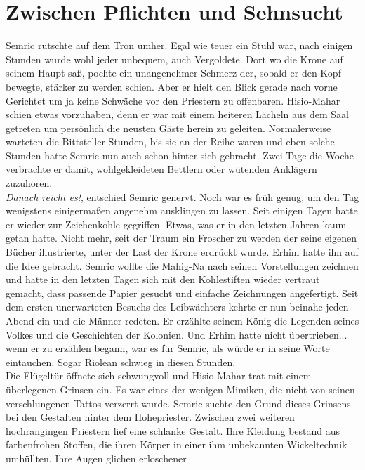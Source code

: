 \chapter{Zwischen Pflichten und Sehnsucht}

Semric rutschte auf dem Tron umher. Egal wie teuer ein Stuhl war, nach einigen Stunden wurde wohl 
jeder unbequem, auch Vergoldete. Dort wo die Krone auf seinem Haupt saß, pochte ein unangenehmer 
Schmerz der, sobald er den Kopf bewegte, stärker zu werden schien. Aber er hielt den Blick gerade 
nach vorne Gerichtet um ja keine Schwäche vor den Priestern zu offenbaren. Hisio-Mahar schien etwas 
vorzuhaben, denn er war mit einem heiteren Lächeln aus dem Saal getreten um persönlich die neusten 
Gäste herein zu geleiten. Normalerweise warteten die Bittsteller Stunden, bis sie an der Reihe 
waren und eben solche Stunden hatte Semric nun auch schon hinter sich gebracht. Zwei Tage die Woche 
verbrachte er damit, wohlgekleideten Bettlern oder wütenden Anklägern zuzuhören.\\
\textit{Danach reicht es!}, entschied Semric genervt. Noch war es früh genug, um den Tag wenigstens 
einigermaßen angenehm ausklingen zu lassen. Seit einigen Tagen hatte er wieder zur Zeichenkohle 
gegriffen. Etwas, was er in den letzten Jahren kaum getan hatte. Nicht mehr, seit der Traum ein 
Froscher zu werden der seine eigenen Bücher illustrierte, unter der Last der Krone erdrückt wurde. 
Erhim hatte ihn auf die Idee gebracht. Semric wollte die Mahig-Na nach seinen Vorstellungen 
zeichnen und hatte in den letzten Tagen sich mit den Kohlestiften wieder vertraut gemacht, dass 
passende Papier gesucht und einfache Zeichnungen angefertigt. Seit dem ersten unerwarteten Besuchs 
des Leibwächters kehrte er nun beinahe jeden Abend ein und die Männer redeten. Er erzählte seinem 
König die Legenden seines Volkes und die Geschichten der Kolonien. Und Erhim hatte nicht 
übertrieben... wenn er zu erzählen begann, war es für Semric, als würde er in seine Worte 
eintauchen. Sogar Riolean schwieg in diesen Stunden.\\
Die Flügeltür öffnete sich schwungvoll und Hisio-Mahar trat mit einem überlegenen Grinsen ein. Es 
war eines der wenigen Mimiken, die nicht von seinen verschlungenen Tattos verzerrt wurde. Semric 
suchte den Grund dieses Grinsens bei den Gestalten hinter dem Hohepriester. Zwischen zwei weiteren 
hochrangingen Priestern lief eine schlanke Gestalt. Ihre Kleidung bestand aus farbenfrohen Stoffen, 
die ihren Körper in einer ihm unbekannten Wickeltechnik umhüllten. Ihre Augen glichen erloschener 
